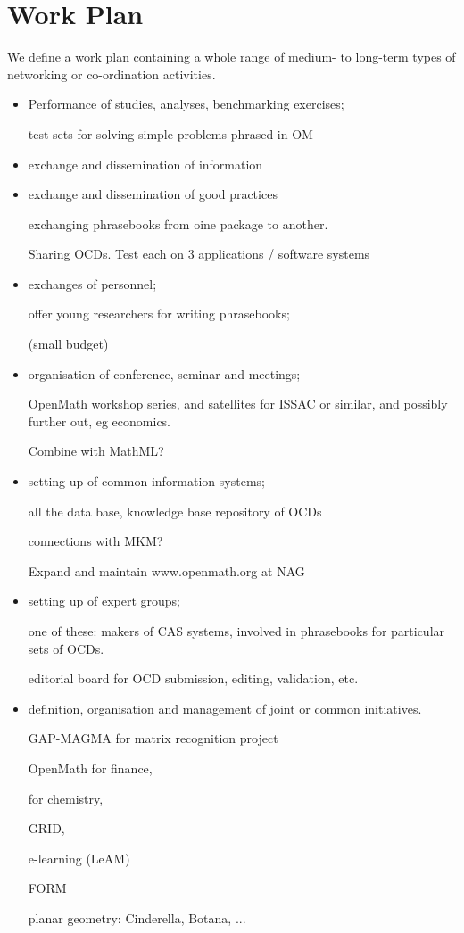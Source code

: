 \documentclass[draft]{artikel3}
\begin{document}
\section{Work Plan}
We define a work plan containing a
whole range of medium- to long-term types of networking or co-ordination
activities.
\begin{itemize}
\item Performance of studies, analyses, benchmarking exercises;

test sets for  solving simple problems phrased in OM


\item exchange and dissemination of information

\item exchange and dissemination of good practices

exchanging phrasebooks from oine package to another.

Sharing OCDs.
Test each on 3 applications / software systems

\item exchanges of personnel;

offer young researchers for writing phrasebooks;

(small  budget)


\item organisation of conference, seminar and meetings;

OpenMath workshop series, and satellites for ISSAC or similar, and
possibly further out, eg economics.

Combine with MathML?

\item setting up of common information systems;

all the data base, knowledge base repository of OCDs

connections with MKM?

Expand and maintain www.openmath.org at NAG


\item setting up of expert groups;

one of these: makers of CAS systems, involved in phrasebooks for
particular sets of OCDs.

editorial board for OCD submission, editing, validation, etc.

\item definition, organisation and management of joint or common
  initiatives.

GAP-MAGMA for matrix recognition project

OpenMath for finance,

for chemistry,

GRID,

e-learning (LeAM)

FORM

planar geometry: Cinderella, Botana, ...



\end{itemize}
\end{document}
